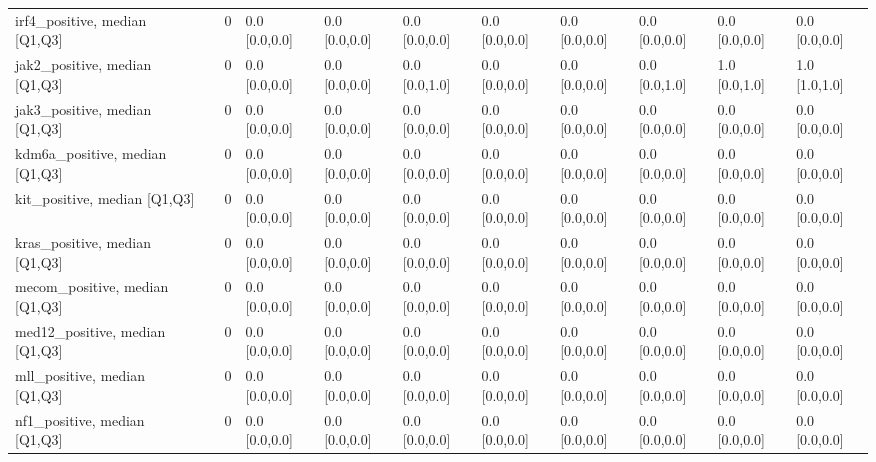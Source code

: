 \begin{tabular}{lllllllllll}
irf4\_positive, median [Q1,Q3] &    &                    0 &       0.0 [0.0,0.0] &      0.0 [0.0,0.0] &        0.0 [0.0,0.0] &       0.0 [0.0,0.0] &     0.0 [0.0,0.0] &     0.0 [0.0,0.0] &       0.0 [0.0,0.0] &        0.0 [0.0,0.0] \\
jak2\_positive, median [Q1,Q3] &    &                    0 &       0.0 [0.0,0.0] &      0.0 [0.0,0.0] &        0.0 [0.0,1.0] &       0.0 [0.0,0.0] &     0.0 [0.0,0.0] &     0.0 [0.0,1.0] &       1.0 [0.0,1.0] &        1.0 [1.0,1.0] \\
jak3\_positive, median [Q1,Q3] &    &                    0 &       0.0 [0.0,0.0] &      0.0 [0.0,0.0] &        0.0 [0.0,0.0] &       0.0 [0.0,0.0] &     0.0 [0.0,0.0] &     0.0 [0.0,0.0] &       0.0 [0.0,0.0] &        0.0 [0.0,0.0] \\
kdm6a\_positive, median [Q1,Q3] &    &                    0 &       0.0 [0.0,0.0] &      0.0 [0.0,0.0] &        0.0 [0.0,0.0] &       0.0 [0.0,0.0] &     0.0 [0.0,0.0] &     0.0 [0.0,0.0] &       0.0 [0.0,0.0] &        0.0 [0.0,0.0] \\
kit\_positive, median [Q1,Q3] &    &                    0 &       0.0 [0.0,0.0] &      0.0 [0.0,0.0] &        0.0 [0.0,0.0] &       0.0 [0.0,0.0] &     0.0 [0.0,0.0] &     0.0 [0.0,0.0] &       0.0 [0.0,0.0] &        0.0 [0.0,0.0] \\
kras\_positive, median [Q1,Q3] &    &                    0 &       0.0 [0.0,0.0] &      0.0 [0.0,0.0] &        0.0 [0.0,0.0] &       0.0 [0.0,0.0] &     0.0 [0.0,0.0] &     0.0 [0.0,0.0] &       0.0 [0.0,0.0] &        0.0 [0.0,0.0] \\
mecom\_positive, median [Q1,Q3] &    &                    0 &       0.0 [0.0,0.0] &      0.0 [0.0,0.0] &        0.0 [0.0,0.0] &       0.0 [0.0,0.0] &     0.0 [0.0,0.0] &     0.0 [0.0,0.0] &       0.0 [0.0,0.0] &        0.0 [0.0,0.0] \\
med12\_positive, median [Q1,Q3] &    &                    0 &       0.0 [0.0,0.0] &      0.0 [0.0,0.0] &        0.0 [0.0,0.0] &       0.0 [0.0,0.0] &     0.0 [0.0,0.0] &     0.0 [0.0,0.0] &       0.0 [0.0,0.0] &        0.0 [0.0,0.0] \\
mll\_positive, median [Q1,Q3] &    &                    0 &       0.0 [0.0,0.0] &      0.0 [0.0,0.0] &        0.0 [0.0,0.0] &       0.0 [0.0,0.0] &     0.0 [0.0,0.0] &     0.0 [0.0,0.0] &       0.0 [0.0,0.0] &        0.0 [0.0,0.0] \\
nf1\_positive, median [Q1,Q3] &    &                    0 &       0.0 [0.0,0.0] &      0.0 [0.0,0.0] &        0.0 [0.0,0.0] &       0.0 [0.0,0.0] &     0.0 [0.0,0.0] &     0.0 [0.0,0.0] &       0.0 [0.0,0.0] &        0.0 [0.0,0.0] \\

\end{tabular}
